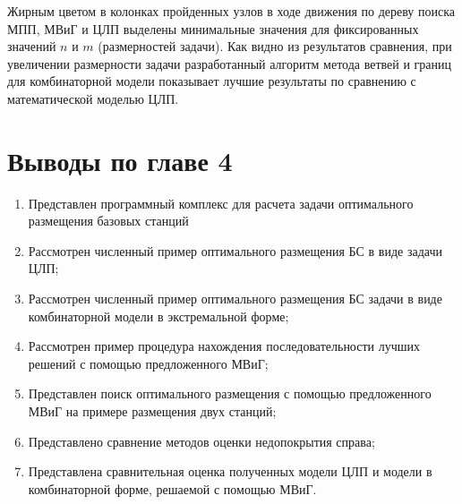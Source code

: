 Жирным цветом в колонках пройденных узлов в ходе движения по дереву поиска МПП, МВиГ и ЦЛП выделены минимальные значения для фиксированных значений $n$ и $m$ (размерностей задачи). Как видно из результатов сравнения, при увеличении размерности задачи разработанный алгоритм метода ветвей и границ для комбинаторной модели показывает лучшие результаты по сравнению с математической моделью ЦЛП.
\FloatBarrier
\section{Выводы по главе 4}

\begin{enumerate}
  \item Представлен программный комплекс для расчета задачи оптимального размещения базовых станций
  \item Рассмотрен численный пример оптимального размещения БС в виде задачи ЦЛП;
  \item Рассмотрен численный пример оптимального размещения БС задачи  в виде комбинаторной модели в экстремальной форме;
  \item Рассмотрен пример процедура нахождения последовательности лучших решений с помощью предложенного МВиГ;
  \item Представлен поиск оптимального размещения с помощью предложенного МВиГ на примере размещения двух станций;
  \item Представлено сравнение методов оценки недопокрытия справа;
  \item Представлена сравнительная оценка полученных модели ЦЛП и модели в комбинаторной форме, решаемой с помощью МВиГ.
\end{enumerate}
